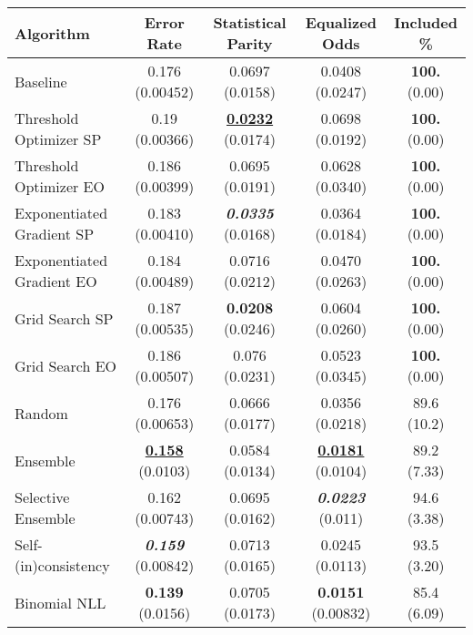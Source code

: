 \begin{tabular} {|l|c|c|c|c|}
\hline
\textbf{Algorithm} & \textbf{Error Rate} & \textbf{Statistical Parity} & \textbf{Equalized Odds} & \textbf{Included \%} \\ \hline
Baseline & 0.176 (0.00452) & 0.0697 (0.0158) & 0.0408 (0.0247) & \textbf{100.} (0.00) \\ \hline 
Threshold Optimizer SP & 0.19 (0.00366) & \textbf{\underline{0.0232}} (0.0174) & 0.0698 (0.0192) & \textbf{100.} (0.00) \\ \hline 
Threshold Optimizer EO & 0.186 (0.00399) & 0.0695 (0.0191) & 0.0628 (0.0340) & \textbf{100.} (0.00) \\ \hline 
Exponentiated Gradient SP & 0.183 (0.00410) & \textbf{\textit{0.0335}} (0.0168) & 0.0364 (0.0184) & \textbf{100.} (0.00) \\ \hline 
Exponentiated Gradient EO & 0.184 (0.00489) & 0.0716 (0.0212) & 0.0470 (0.0263) & \textbf{100.} (0.00) \\ \hline 
Grid Search SP & 0.187 (0.00535) & \textbf{0.0208} (0.0246) & 0.0604 (0.0260) & \textbf{100.} (0.00) \\ \hline 
Grid Search EO & 0.186 (0.00507) & 0.076 (0.0231) & 0.0523 (0.0345) & \textbf{100.} (0.00) \\ \hline 
Random & 0.176 (0.00653) & 0.0666 (0.0177) & 0.0356 (0.0218) & 89.6 (10.2) \\ \hline 
Ensemble & \textbf{\underline{0.158}} (0.0103) & 0.0584 (0.0134) & \textbf{\underline{0.0181}} (0.0104) & 89.2 (7.33) \\ \hline 
Selective Ensemble & 0.162 (0.00743) & 0.0695 (0.0162) & \textbf{\textit{0.0223}} (0.011) & 94.6 (3.38) \\ \hline 
Self-(in)consistency & \textbf{\textit{0.159}} (0.00842) & 0.0713 (0.0165) & 0.0245 (0.0113) & 93.5 (3.20) \\ \hline 
Binomial NLL & \textbf{0.139} (0.0156) & 0.0705 (0.0173) & \textbf{0.0151} (0.00832) & 85.4 (6.09) \\ \hline 
\end{tabular}